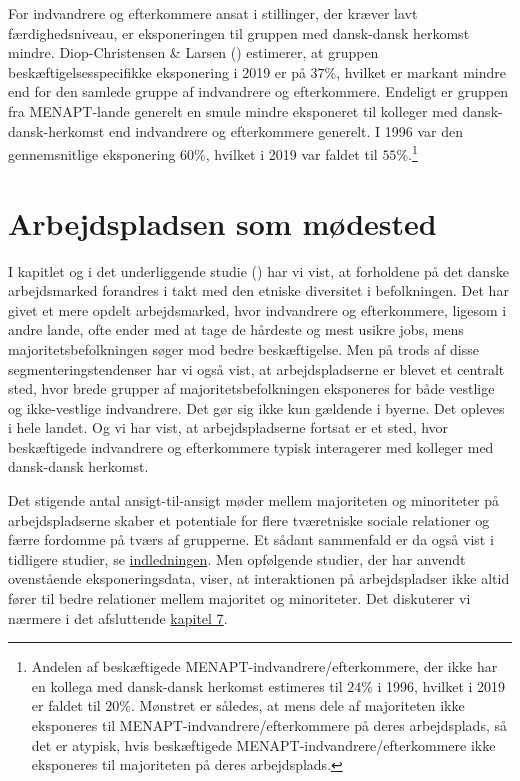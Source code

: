 \documentclass[
]{book}
\begin{document}
For indvandrere og efterkommere ansat i stillinger, der kræver lavt færdighedsniveau, er eksponeringen til gruppen med dansk-dansk herkomst mindre. Diop-Christensen \& Larsen () estimerer, at gruppen beskæftigelsesspecifikke eksponering i 2019 er på \(37\%\), hvilket er markant mindre end for den samlede gruppe af indvandrere og efterkommere. Endeligt er gruppen fra MENAPT-lande generelt en smule mindre eksponeret til kolleger med dansk-dansk-herkomst end indvandrere og efterkommere generelt. I 1996 var den gennemsnitlige eksponering \(60\%\), hvilket i 2019 var faldet til \(55\%\).\footnote{Andelen af beskæftigede MENAPT-indvandrere/efterkommere, der ikke har en kollega med dansk-dansk herkomst estimeres til \(24\%\) i 1996, hvilket i 2019 er faldet til \(20\%\). Mønstret er således, at mens dele af majoriteten ikke eksponeres til MENAPT-indvandrere/efterkommere på deres arbejdsplads, så det er atypisk, hvis beskæftigede MENAPT-indvandrere/efterkommere ikke eksponeres til majoriteten på deres arbejdsplads.}

\section{Arbejdspladsen som mødested}\label{arbejdspladsen-som-muxf8dested}

I kapitlet og i det underliggende studie () har vi vist, at forholdene på det danske arbejdsmarked forandres i takt med den etniske diversitet i befolkningen. Det har givet et mere opdelt arbejdsmarked, hvor indvandrere og efterkommere, ligesom i andre lande, ofte ender med at tage de hårdeste og mest usikre jobs, mens majoritetsbefolkningen søger mod bedre beskæftigelse. Men på trods af disse segmenteringstendenser har vi også vist, at arbejdspladserne er blevet et centralt sted, hvor brede grupper af majoritetsbefolkningen eksponeres for både vestlige og ikke-vestlige indvandrere. Det gør sig ikke kun gældende i byerne. Det opleves i hele landet. Og vi har vist, at arbejdspladserne fortsat er et sted, hvor beskæftigede indvandrere og efterkommere typisk interagerer med kolleger med dansk-dansk herkomst.

Det stigende antal ansigt-til-ansigt møder mellem majoriteten og minoriteter på arbejdspladserne skaber et potentiale for flere tværetniske sociale relationer og færre fordomme på tværs af grupperne. Et sådant sammenfald er da også vist i tidligere studier, se \hyperref[indledning]{indledningen}. Men opfølgende studier, der har anvendt ovenstående eksponeringsdata, viser, at interaktionen på arbejdspladser ikke altid fører til bedre relationer mellem majoritet og minoriteter. Det diskuterer vi nærmere i det afsluttende \hyperref[kap7]{kapitel 7}.
\end{document}
